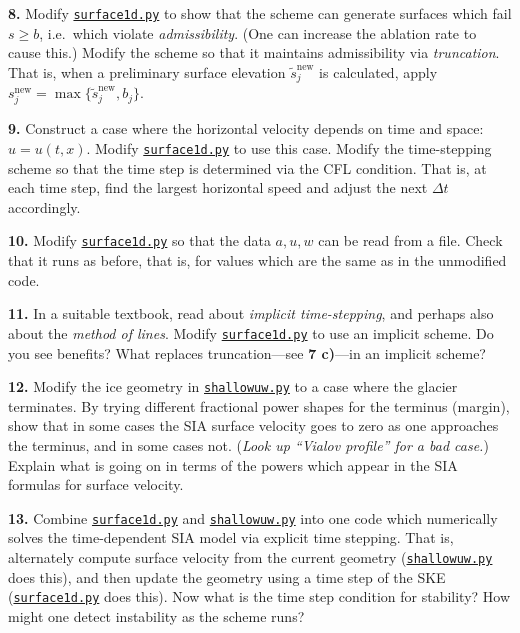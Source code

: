 \documentclass[12pt]{amsart}
\newcommand{\prob}[1]{\bigskip\noindent\textbf{#1.}\quad }
\begin{document}
\prob{8}  Modify \href{https://github.com/bueler/mccarthy/blob/master/py/surface1d.py}{\texttt{surface1d.py}} to show that the scheme can generate surfaces which fail $s\ge b$, i.e.~which violate \emph{admissibility}.  (One can increase the ablation rate to cause this.)  Modify the scheme so that it maintains admissibility via \emph{truncation}.  That is, when a preliminary surface elevation ${\tilde s}_j^{\text{new}}$ is calculated, apply $s_j^{\text{new}} = \max\{{\tilde s}_j^{\text{new}},b_j\}$.

\prob{9}  Construct a case where the horizontal velocity depends on time and space: $u=u(t,x)$.  Modify \href{https://github.com/bueler/mccarthy/blob/master/py/surface1d.py}{\texttt{surface1d.py}} to use this case.  Modify the time-stepping scheme so that the time step is determined via the CFL condition.  That is, at each time step, find the largest horizontal speed and adjust the next $\Delta t$ accordingly.

\prob{10}  Modify \href{https://github.com/bueler/mccarthy/blob/master/py/surface1d.py}{\texttt{surface1d.py}} so that the data $a,u,w$ can be read from a file.  Check that it runs as before, that is, for values which are the same as in the unmodified code.

\prob{11}  In a suitable textbook, read about \emph{implicit time-stepping}, and perhaps also about the \emph{method of lines}.  Modify \href{https://github.com/bueler/mccarthy/blob/master/py/surface1d.py}{\texttt{surface1d.py}} to use an implicit scheme.  Do you see benefits?  What replaces truncation---see \textbf{7 c)}---in an implicit scheme?

\prob{12}  Modify the ice geometry in \href{https://github.com/bueler/mccarthy/blob/master/py/shallowuw.py}{\texttt{shallowuw.py}} to a case where the glacier terminates.  By trying different fractional power shapes for the terminus (margin), show that in some cases the SIA surface velocity goes to zero as one approaches the terminus, and in some cases not.  (\emph{Look up ``Vialov profile'' for a bad case.})  Explain what is going on in terms of the powers which appear in the SIA formulas for surface velocity.

\prob{13}  Combine \href{https://github.com/bueler/mccarthy/blob/master/py/surface1d.py}{\texttt{surface1d.py}} and \href{https://github.com/bueler/mccarthy/blob/master/py/shallowuw.py}{\texttt{shallowuw.py}} into one code which numerically solves the time-dependent SIA model via explicit time stepping.  That is, alternately compute surface velocity from the current geometry (\href{https://github.com/bueler/mccarthy/blob/master/py/shallowuw.py}{\texttt{shallowuw.py}} does this), and then update the geometry using a time step of the SKE (\href{https://github.com/bueler/mccarthy/blob/master/py/surface1d.py}{\texttt{surface1d.py}} does this).  Now what is the time step condition for stability?  How might one detect instability as the scheme runs?
\end{document}
